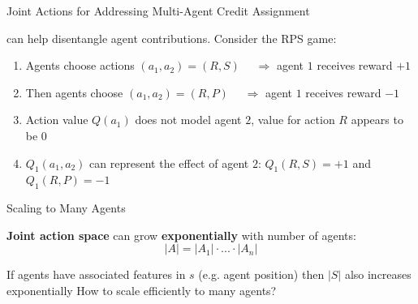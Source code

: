 \begin{frame}[t]{Joint Actions for Addressing Multi-Agent Credit Assignment}

 can help disentangle agent contributions. Consider the RPS game:

\vspace{5pt}

\centering
\gamerps 

\vspace{5pt}

\begin{enumerate}
    \item<2-> Agents choose actions $(a_1, a_2) = (R, S)$ $\quad\Rightarrow$ agent $1$ receives reward $+1$
    \item<3-> Then agents choose $(a_1, a_2) = (R, P)$ $\quad\Rightarrow$ agent $1$ receives reward $-1$
    \item<4-> Action value $Q(a_1)$ does not model agent $2$, value for action $R$ appears to be 0
    \item<5->  $Q_1(a_1, a_2)$ can represent the effect of agent $2$: $Q_1(R, S)=+1$ and $Q_1(R, P)=-1$
\end{enumerate}

\end{frame}

\begin{frame}{Scaling to Many Agents}

    \begin{problembox}
	    \blist
	        \item \textbf{Joint action space} can grow \textbf{exponentially} with number of agents:
	        	$$|A| = |A_1| \cdot ... \cdot |A_n|$$
	        \item If agents have associated features in $s$ (e.g. agent position) then $|S|$ also increases exponentially
	        \listtab How to scale efficiently to many agents?
	    \elist
    \end{problembox}

\end{frame}

